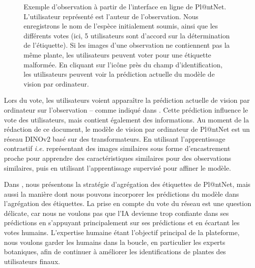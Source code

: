 \begin{figure}[H]
\begin{minipage}{.4\linewidth}
    \end{minipage}\par\medskip
        \caption{Exemple d'observation à partir de l'interface en ligne de Pl@ntNet. L'utilisateur représenté est l'auteur de l'observation. Nous enregistrons le nom de l'espèce initialement soumis, ainsi que les différents votes (ici, 5 utilisateurs sont d'accord sur la détermination de l'étiquette). Si les images d'une observation ne contiennent pas la même plante, les utilisateurs peuvent voter pour une étiquette malformée. En cliquant sur l'icône près du champ d'identification, les utilisateurs peuvent voir la prédiction actuelle du modèle de vision par ordinateur.}
    \end{figure}


Lors du vote, les utilisateurs voient apparaître la prédiction actuelle de vision par ordinateur sur l'observation -- comme indiqué dans . Cette prédiction influence le vote des utilisateurs, mais contient également des informations.
Au moment de la rédaction de ce document, le modèle de vision par ordinateur de Pl@ntNet est un réseau DINOv2 \citep{oquab2024dinov2} basé sur des transformateurs.
En utilisant l'apprentissage contrastif \citep{waida2023understanding} \emph{i.e.} représentant des images similaires sous forme d'encastrement proche pour apprendre des caractéristiques similaires pour des observations similaires, puis en utilisant l'apprentissage supervisé pour affiner le modèle.

Dans , nous présentons la stratégie d'agrégation des étiquettes de Pl@ntNet, mais aussi la manière dont nous pouvons incorporer les prédictions du modèle dans l'agrégation des étiquettes.
La prise en compte du vote du réseau est une question délicate, car nous ne voulons pas que l'IA devienne trop confiante dans ses prédictions en s'appuyant principalement sur ses prédictions et en écartant les votes humains.
L'expertise humaine étant l'objectif principal de la plateforme, nous voulons garder les humains dans la boucle, en particulier les experts botaniques, afin de continuer à améliorer les identifications de plantes des utilisateurs finaux.

